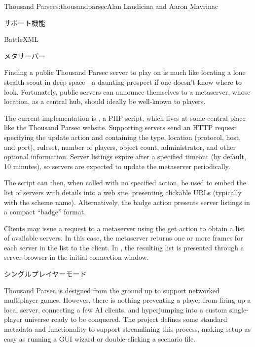 \begin{aosachapter}{Thousand Parsec}{s:thousandparsec}{Alan Laudicina and Aaron Mavrinac}
\begin{aosasect1}{サポート機能}
\begin{aosasect2}{BattleXML}
\end{aosasect2}

\begin{aosasect2}{メタサーバー}

Finding a public Thousand Parsec server to play on 
is much like locating a lone stealth scout in deep space---a
daunting prospect if one doesn't know where to look. Fortunately,
public servers can announce themselves to a metaserver, whose
location, as a central hub, should ideally be well-known to players.

The current implementation is , a PHP script,
which lives at some central place like the Thousand Parsec
website. Supporting servers send an HTTP request specifying the update
action and containing the type, location (protocol, host, and port),
ruleset, number of players, object count, administrator, and other
optional information. Server listings expire after a specified timeout
(by default, 10 minutes), so servers are expected to update the
metaserver periodically.

The script can then, when called with no specified action, be used to
embed the list of servers with details into a web site, presenting
clickable URLs (typically with the  scheme
name). Alternatively, the badge action presents server listings in a
compact ``badge'' format.

Clients may issue a request to a metaserver using the get action to
obtain a list of available servers. In this case, the metaserver
returns one or more  frames for each server in the list to
the client. In , the resulting list is presented
through a server browser in the initial connection window.

\end{aosasect2}

\begin{aosasect2}{シングルプレイヤーモード}

Thousand Parsec is designed from the ground up to support networked
multiplayer games. However, there is nothing preventing a player from
firing up a local server, connecting a few AI clients, and
hyperjumping into a custom single-player universe ready to be
conquered. The project defines some standard metadata and
functionality to support streamlining this process, making setup as
easy as running a GUI wizard or double-clicking a scenario file.


\end{aosasect2}
\end{aosasect1}
\end{aosachapter}

